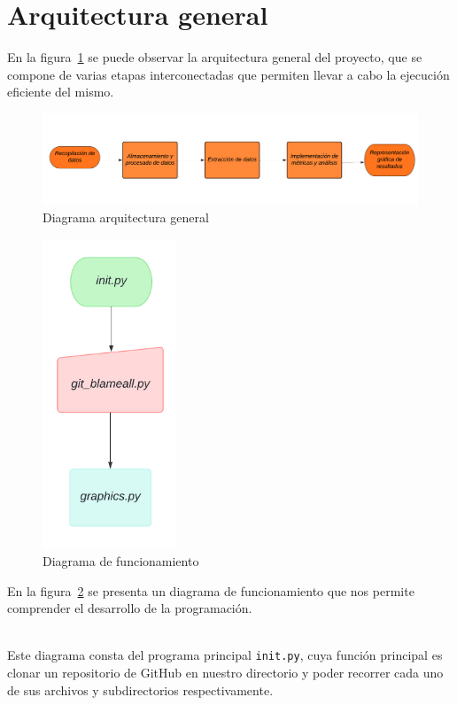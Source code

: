 \documentclass[a4paper, 12pt]{book}
\begin{document}
\section{Arquitectura general} 
\label{sec:arquitectura-general}

En la figura~\ref{fig:arquitectura} se puede observar la arquitectura general del proyecto, que se compone de varias etapas interconectadas que permiten llevar a cabo la ejecución eficiente del mismo.

\begin{figure}
  \centering
  \includegraphics[width=14cm, keepaspectratio]{img/Arquitectura_general.png}
  \caption{Diagrama arquitectura general}
  \label{fig:arquitectura}
\end{figure}

\begin{figure}
  \centering
  \includegraphics[width=4cm, keepaspectratio]{img/Diagrama_Funcionamiento.png}
  \caption{Diagrama de funcionamiento}
  \label{fig:funcionamiento}
\end{figure}

En la figura~\ref{fig:funcionamiento} se presenta un diagrama de funcionamiento que nos permite comprender el desarrollo de la programación. 

\\Este diagrama consta del programa principal \texttt{init.py}, cuya función principal es clonar un repositorio de GitHub en nuestro directorio y poder recorrer cada uno de sus archivos y subdirectorios respectivamente.
\end{document}
